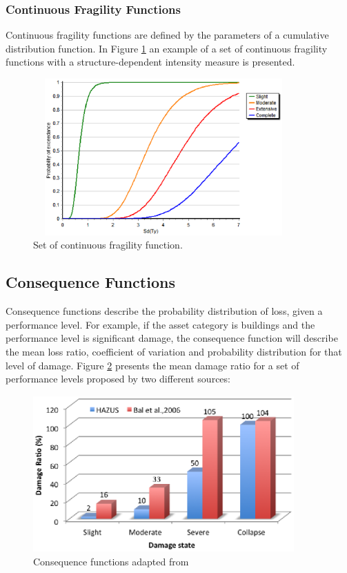 \subsubsection{Continuous Fragility Functions}
Continuous fragility functions are defined by the parameters of a cumulative distribution function. In Figure \ref{fig:FFcontinuous} an example of a set of continuous fragility functions with a structure-dependent intensity measure is presented.

\begin{figure}[ht]
\centering
\includegraphics[width=10cm,height=6cm]{./Figures/Part_Risk/FFContinuous.eps}
\caption{Set of continuous fragility function.}
\label{fig:FFcontinuous}
\end{figure}

\subsection{Consequence Functions}
Consequence functions describe the probability distribution of loss, given a performance level. For example, if the asset category is buildings and the performance level is significant damage, the consequence function will describe the mean loss ratio, coefficient of variation and probability distribution for that level of damage. Figure \ref{fig:ConsequenceFunctions} presents the mean damage ratio for a set of performance levels proposed by two different sources:

\begin{figure}[ht]
\centering
\includegraphics[width=10cm,height=6cm]{./Figures/Part_Risk/ConsequenceFunction.eps}
\caption{Consequence functions adapted from  \citet{Baletal2010}}
\label{fig:ConsequenceFunctions}
\end{figure}

